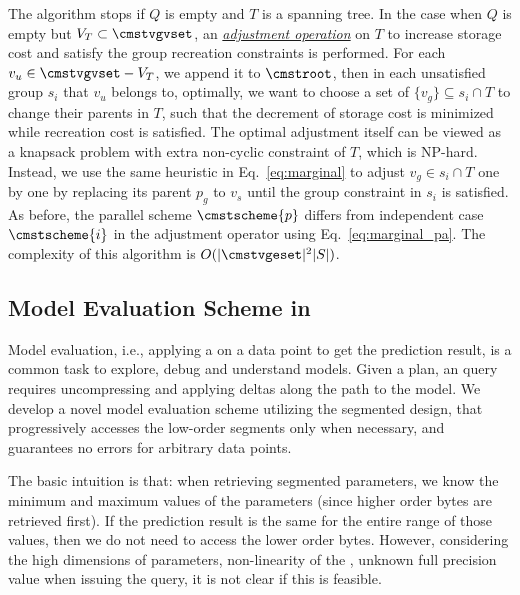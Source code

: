 \documentclass[conference]{IEEEtran}
\begin{document}
The algorithm stops if $Q$ is empty and $T$ is a spanning tree. In the case when $Q$ is empty but $V_T \subset \cmstvgvset$, an \underline{\emph{adjustment operation}} on $T$ to increase storage cost and satisfy the group recreation constraints is performed. 
For each $v_u \in \cmstvgvset-V_T$, we append it to $\cmstroot$, then in each unsatisfied group $s_i$ that $v_u$ belongs to, optimally, we want to choose a set of $\{v_g\} \subseteq s_i \cap T$ to change their parents in $T$, such that the decrement of storage cost is minimized while recreation cost is satisfied. The optimal adjustment itself can be viewed as a knapsack problem with extra non-cyclic constraint of $T$, which is NP-hard. Instead, we use the same heuristic in Eq.~\ref{eq:marginal} to adjust $v_g \in s_i \cap T$ one by one by replacing its parent $p_g$ to $v_s$ until the group constraint in $s_i$ is satisfied.
 As before, the parallel scheme $\cmstscheme{p}$ differs from independent case $\cmstscheme{i}$ in the adjustment operator using Eq.~\ref{eq:marginal_pa}. The complexity of this algorithm is $O(|\cmstvgeset|^2|S|)$.


\subsection{Model Evaluation Scheme in {\weightstore}}
\label{subsec:pas_evaluation}
Model evaluation, i.e., applying a \dnn\forward on a data point to get the prediction result, is a common task to explore, debug and understand models. 
Given a \weightstore\storage plan, an  query requires uncompressing and applying deltas along the path to the model. We develop 
a novel model evaluation scheme utilizing the segmented design, that progressively accesses the low-order segments only when necessary, and 
guarantees no errors for arbitrary data points. 


The basic intuition is that: when retrieving segmented parameters, we know the minimum and maximum values of the parameters (since higher order bytes are retrieved first). 
If the prediction result is the same for the entire range of those values, then we do not need to access the lower order bytes. 
However, considering the high dimensions of parameters, non-linearity of the \dnn\model, unknown full precision value when issuing the query, it is not clear if this is feasible.
\end{document}
